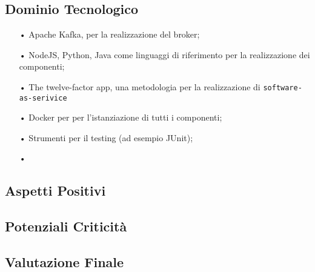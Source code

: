 \subsection{Dominio Tecnologico}
\begin{itemize}
\item[•]Apache Kafka, per la realizzazione del broker;
\item[•]NodeJS, Python, Java come linguaggi di riferimento per la realizzazione dei componenti;
\item[•]The twelve-factor app, una metodologia per la realizzazione di \texttt{software-as-serivice}
\item[•]Docker per per l’istanziazione di
tutti i componenti;
\item[•]Strumenti per il testing (ad esempio JUnit);
\item[•]
\end{itemize}


\subsection{Aspetti Positivi}

\subsection{Potenziali Criticità}

\subsection{Valutazione Finale}

